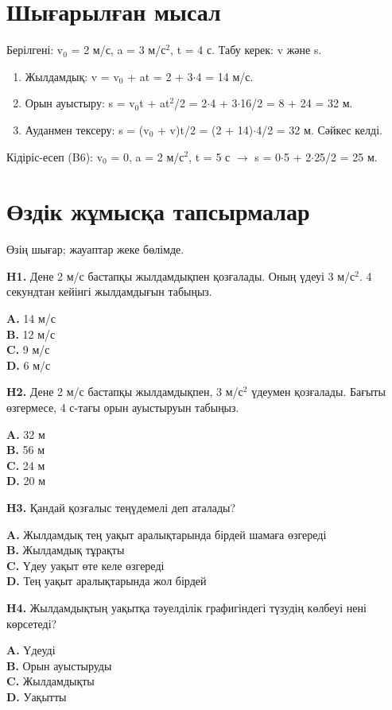 \documentclass[11pt]{article}
\begin{document}
\section*{Шығарылған мысал}
Берілгені: v$_0$ = 2 м/с, a = 3 м/с$^2$, t = 4 с. Табу керек: v және s.
\begin{enumerate}
\item Жылдамдық: v = v$_0$ + at = 2 + 3$\cdot$4 = 14 м/с.
\item Орын ауыстыру: s = v$_0$t + at$^2$/2 = 2$\cdot$4 + 3$\cdot$16/2 = 8 + 24 = 32 м.
\item Ауданмен тексеру: s = (v$_0$ + v)t/2 = (2 + 14)$\cdot$4/2 = 32 м. Сәйкес келді.
\end{enumerate}
Кідіріс-есеп (B6): v$_0$ = 0, a = 2 м/с$^2$, t = 5 с $\to$ s = 0$\cdot$5 + 2$\cdot$25/2 = 25 м.
\section*{Өздік жұмысқа тапсырмалар}
Өзің шығар; жауаптар жеке бөлімде.


\textbf{H1.} Дене 2 м/с бастапқы жылдамдықпен қозғалады. Оның үдеуі 3 м/с$^2$. 4 секундтан кейінгі жылдамдығын табыңыз.

\textbf{A.} 14 м/с \\
\textbf{B.} 12 м/с \\
\textbf{C.} 9 м/с \\
\textbf{D.} 6 м/с

\textbf{H2.} Дене 2 м/с бастапқы жылдамдықпен, 3 м/с$^2$ үдеумен қозғалады. Бағыты өзгермесе, 4 с-тағы орын ауыстыруын табыңыз.

\textbf{A.} 32 м \\
\textbf{B.} 56 м \\
\textbf{C.} 24 м \\
\textbf{D.} 20 м

\textbf{H3.} Қандай қозғалыс теңүдемелі деп аталады?

\textbf{A.} Жылдамдық тең уақыт аралықтарында бірдей шамаға өзгереді \\
\textbf{B.} Жылдамдық тұрақты \\
\textbf{C.} Үдеу уақыт өте келе өзгереді \\
\textbf{D.} Тең уақыт аралықтарында жол бірдей

\textbf{H4.} Жылдамдықтың уақытқа тәуелділік графигіндегі түзудің көлбеуі нені көрсетеді?

\textbf{A.} Үдеуді \\
\textbf{B.} Орын ауыстыруды \\
\textbf{C.} Жылдамдықты \\
\textbf{D.} Уақытты
\end{document}

